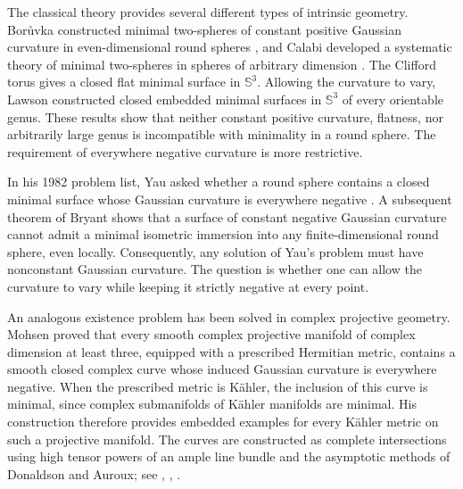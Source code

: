 \documentclass[a4paper,11pt,oneside,reqno]{amsart}
\numberwithin{equation}{section}
\theoremstyle{definition}
\begin{document}
The classical theory provides several different types of
intrinsic geometry. Borůvka constructed minimal two-spheres
of constant positive Gaussian curvature in even-dimensional
round spheres \cite{BoruvkaSphericalSurfaces}, and Calabi
developed a systematic theory of minimal two-spheres in
spheres of arbitrary dimension
\cite{CalabiMinimalImmersionsSpheres}.
The Clifford torus gives a closed flat minimal surface in
$\mathbb{S}^3$. Allowing the curvature to vary, Lawson
\cite{LawsonCompleteMinimalSurfaces} constructed closed
embedded minimal surfaces in $\mathbb{S}^3$ of every
orientable genus. These results show that neither constant
positive curvature, flatness, nor arbitrarily large genus
is incompatible with minimality in a round sphere.
The requirement of everywhere negative curvature is more
restrictive.

In his 1982 problem list, Yau asked whether a round sphere
contains a closed minimal surface whose Gaussian curvature
is everywhere negative
\cite[Problem~101]{YauProblemSection}.
A subsequent theorem of Bryant
\cite[Theorem~2.3]{BryantConstantCurvature}
shows that a surface of constant negative Gaussian curvature
cannot admit a minimal isometric immersion into any
finite-dimensional round sphere, even locally.
Consequently, any solution of Yau's problem must have
nonconstant Gaussian curvature. The question is whether
one can allow the curvature to vary while keeping it
strictly negative at every point. 

An analogous existence problem has been solved in complex
projective geometry. Mohsen
\cite{MohsenNegativelyCurvedCompleteIntersections}
proved that every smooth complex projective manifold of
complex dimension at least three, equipped with a prescribed
Hermitian metric, contains a smooth closed complex curve
whose induced Gaussian curvature is everywhere negative.
When the prescribed metric is K\"ahler, the inclusion of
this curve is minimal, since complex submanifolds of
K\"ahler manifolds are minimal. His construction therefore
provides embedded examples for every K\"ahler metric on
such a projective manifold. The curves are constructed
as complete intersections using high tensor powers of
an ample line bundle and the asymptotic methods of
Donaldson and Auroux; see \cite{Donaldson1996}, \cite{Auroux1997}, \cite{Auroux2001Estimated}.
\end{document}
